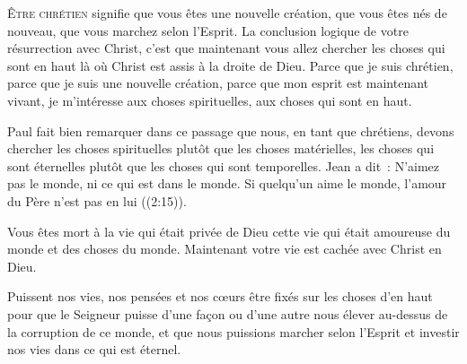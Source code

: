 \dvrule






\lettrine{Ê}{tre chrétien} signifie que vous êtes une nouvelle création,
 que vous êtes nés de nouveau, que vous marchez selon l'Esprit.
 La conclusion logique de votre résurrection avec Christ,
 c'est que maintenant vous allez chercher  les choses
 qui sont en haut là où Christ est assis à la droite de Dieu.
 Parce que je suis chrétien, parce que je suis une nouvelle création,
 parce que mon esprit est maintenant vivant, je m'intéresse aux choses
 spirituelles, aux choses qui sont en haut.


Paul fait bien  remarquer dans ce passage
 que nous, en tant que chrétiens, devons chercher les choses spirituelles
 plutôt que les choses matérielles, les choses qui sont éternelles plutôt
 que les choses qui sont temporelles. Jean a dit~: 
 \og N'aimez pas le monde, ni ce qui est dans le monde.
 Si quelqu'un aime le monde, l'amour du Père n'est pas en lui \fg{}
 ((2:15)). 

Vous êtes mort à la vie qui était privée de Dieu
 \ocadr cette vie qui était amoureuse du monde et des choses du monde.
 Maintenant votre vie est cachée avec Christ en Dieu.

Puissent nos vies, nos pensées et nos cœurs être fixés
 sur les choses d'en haut \ocadr pour que le Seigneur puisse d'une façon
 ou d'une autre nous élever au-dessus de la corruption de ce monde,
 et que nous puissions marcher selon l'Esprit et investir nos vies
 dans ce qui est éternel.

\dvrule

